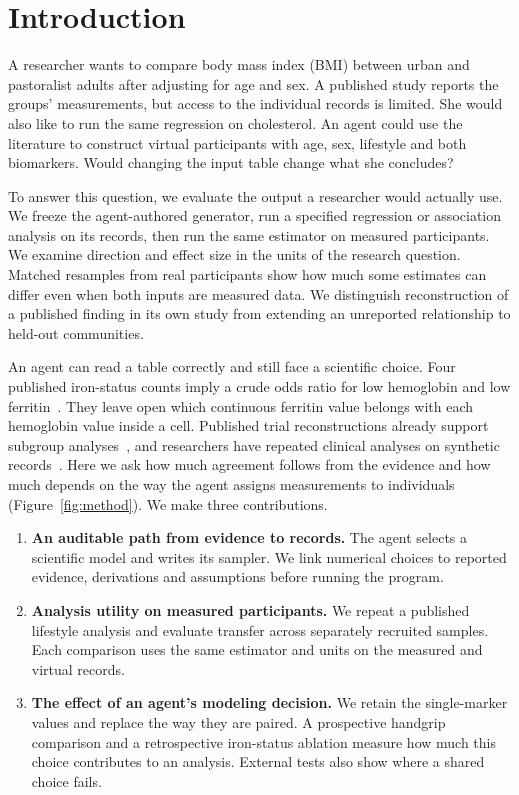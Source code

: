 \documentclass[sigconf,anonymous,review]{acmart}
\begin{document}
\section{Introduction}
A researcher wants to compare body mass index (BMI) between urban and pastoralist adults after adjusting for age and sex. A published study reports the groups' measurements, but access to the individual records is limited. She would also like to run the same regression on cholesterol. An agent could use the literature to construct virtual participants with age, sex, lifestyle and both biomarkers. Would changing the input table change what she concludes?

To answer this question, we evaluate the output a researcher would actually use. We freeze the agent-authored generator, run a specified regression or association analysis on its records, then run the same estimator on measured participants. We examine direction and effect size in the units of the research question. Matched resamples from real participants show how much some estimates can differ even when both inputs are measured data. We distinguish reconstruction of a published finding in its own study from extending an unreported relationship to held-out communities.

An agent can read a table correctly and still face a scientific choice. Four published iron-status counts imply a crude odds ratio for low hemoglobin and low ferritin~\cite{zhu}. They leave open which continuous ferritin value belongs with each hemoglobin value inside a cell. Published trial reconstructions already support subgroup analyses~\cite{synthipd}, and researchers have repeated clinical analyses on synthetic records~\cite{azizi}. Here we ask how much agreement follows from the evidence and how much depends on the way the agent assigns measurements to individuals (Figure~\ref{fig:method}). We make three contributions.
\begin{enumerate}
\item \textbf{An auditable path from evidence to records.} The agent selects a scientific model and writes its sampler. We link numerical choices to reported evidence, derivations and assumptions before running the program.
\item \textbf{Analysis utility on measured participants.} We repeat a published lifestyle analysis and evaluate transfer across separately recruited samples. Each comparison uses the same estimator and units on the measured and virtual records.
\item \textbf{The effect of an agent's modeling decision.} We retain the single-marker values and replace the way they are paired. A prospective handgrip comparison and a retrospective iron-status ablation measure how much this choice contributes to an analysis. External tests also show where a shared choice fails.
\end{enumerate}
\end{document}
